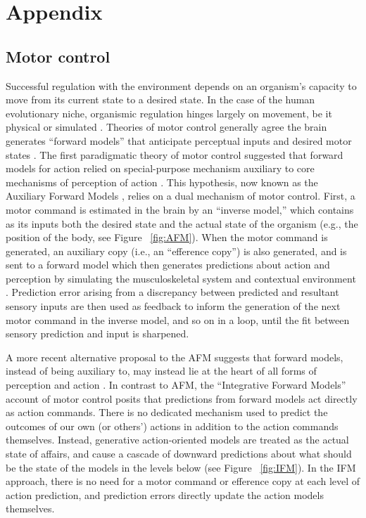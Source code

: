 \chapter{\label{app2:theory}Appendix}




\section{Motor control\label{app2:motorControl}}
Successful regulation with the environment depends on an organism's capacity to move from its current state to a desired state.  In the case of the human evolutionary niche, organismic regulation hinges largely on movement, be it physical or simulated \citep{Wolpert1995}.  Theories of motor control generally agree the brain generates ``forward models'' that anticipate perceptual inputs and desired motor states \citep{Pickering2014}. The first paradigmatic theory of motor control suggested that forward models for action relied on special-purpose mechanism auxiliary to core mechanisms of perception of action \citep{Wolpert1997}.  This hypothesis, now known as the Auxiliary Forward Models \citep[AFM, see][]{Pickering2014}, relies on a dual mechanism of motor control.  First, a motor command is estimated in the brain by an ``inverse model,'' which contains as its inputs both the desired state and the actual state of the organism (e.g., the position of the body, see Figure ~\ref{fig:AFM}).  When the motor command is generated, an auxiliary copy (i.e., an ``efference copy'') is also generated, and is sent to a forward model which then generates predictions about action and perception by simulating the musculoskeletal system and contextual environment \citep{Wolpert1995,Blakemore1998,Flanagan2003}.  Prediction error arising from a discrepancy between predicted and resultant sensory inputs are then used as feedback to inform the generation of the next motor command in the inverse model, and so on in a loop, until the fit between sensory prediction and input is sharpened.

A more recent alternative proposal to the AFM suggests that forward models, instead of being auxiliary to, may instead lie at the heart of all forms of perception and action \citep{Friston2010}.  In contrast to AFM, the ``Integrative Forward Models'' account of motor control \citep[IFM, see][]{Pickering2014} posits that predictions from forward models act directly as action commands.  There is no dedicated mechanism used to predict the outcomes of our own (or others’) actions in addition to the action commands themselves.  Instead, generative action-oriented models are treated as the actual state of affairs, and cause a cascade of downward predictions about what should be the state of the models in the levels below (see Figure ~\ref{fig:IFM}).  In the IFM approach, there is no need for a motor command or efference copy at each level of action prediction, and prediction errors directly update the action models themselves.



